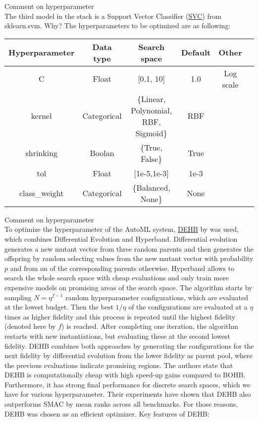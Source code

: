 \documentclass[11pt]{article}
\begin{document}
Comment on hyperparameter \\

The third model in the stack is a Support Vector Classifier (\href{https://scikit-learn.org/stable/modules/generated/sklearn.svm.SVC.html#sklearn.svm.SVC}{SVC}) from sklearn.svm. Why? The hyperparameters to be optimized are as following:
\begin{table}[h]
\begin{tabular}{ | c | c | c | c | c | c | }
 \hline
  Hyperparameter & Data type & Search space & Default & Other \\
 \hline
 C & Float & [0.1, 10]  & 1.0 & Log scale \\ 
 kernel & Categorical & \{Linear, Polynomial, RBF, Sigmoid\}  & RBF &   \\ 
 shrinking & Boolan & \{True, False\} & True &  \\ 
 tol & Float & [1e-5,1e-3] & 1e-3 &  \\ 
 class\_weight & Categorical & \{Balanced, None\}  & None &  \\ 
 \hline
\end{tabular}
\end{table}

Comment on hyperparameter \\

To optimize the hyperparameter of the AutoML system, \href{https://github.com/automl/dehb}{DEHB} by \citet{dehb} was used, which combines Differential Evolution and Hyperband. Differential evolution generates a new mutant vector from three random parents and then generates the offspring by random selecting values from the new mutant vector with probability $p$ and from on of the corresponding parents otherwise. Hyperband allows to search the whole search space with cheap evaluations and only train more expensive models on promising areas of the search space. The algorithm starts by sampling $N=\eta^{f-1}$ random hyperparameter configurations, which are evaluated at the lowest budget. Then the best $1/\eta$ of the configurations are evaluated at a $\eta$ times as higher fidelity and this process is repeated until the highest fidelity (denoted here by $f$) is reached. After completing one iteration, the algorithm restarts with new instantiations, but evaluating these at the second lowest fidelity. DEHB combines both approaches by generating the configurations for the next fidelity by differential evolution from the lower fidelity as parent pool, where the previous evaluations indicate promising regions. The authors state that DEHB is computationally cheap with high speed-up gains compared to BOHB. Furthermore, it has strong final performance for discrete search spaces, which we have for various hyperparameter. Their experiments have shown that DEHB also outperforms SMAC by mean ranks across all benchmarks. For those reasons, DEHB was chosen as an efficient optimizer. Key features of DEHB: \\
\end{document}
